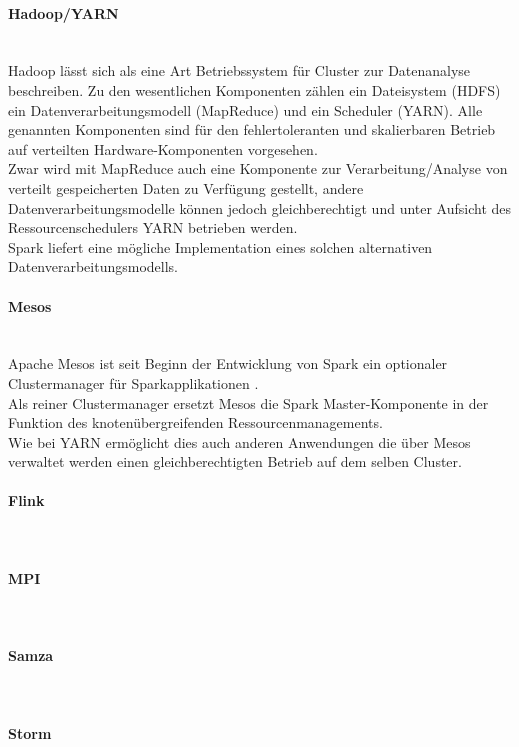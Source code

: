 \paragraph{Hadoop/YARN}\\
Hadoop lässt sich als eine Art Betriebssystem für Cluster zur Datenanalyse beschreiben. Zu den wesentlichen Komponenten zählen ein Dateisystem (HDFS) ein Datenverarbeitungsmodell (MapReduce) und ein Scheduler (YARN).
Alle genannten Komponenten sind für den fehlertoleranten und skalierbaren Betrieb auf verteilten Hardware-Komponenten vorgesehen.\\
Zwar wird mit MapReduce auch eine Komponente zur Verarbeitung/Analyse von verteilt gespeicherten Daten zu Verfügung gestellt, andere Datenverarbeitungsmodelle können jedoch gleichberechtigt und unter Aufsicht des Ressourcenschedulers YARN betrieben werden.\\

Spark liefert eine mögliche Implementation eines solchen alternativen Datenverarbeitungsmodells.

\paragraph{Mesos}\\
Apache Mesos ist seit Beginn der Entwicklung von Spark ein optionaler Clustermanager für Sparkapplikationen \cite{Mat12}.\\
Als reiner Clustermanager ersetzt Mesos die Spark Master-Komponente in der Funktion des knotenübergreifenden Ressourcenmanagements.\\
Wie bei YARN ermöglicht dies auch anderen Anwendungen die über Mesos verwaltet werden einen gleichberechtigten Betrieb auf dem selben Cluster.\\

\paragraph{Flink}\\

\paragraph{MPI}\\

\paragraph{Samza}\\

\paragraph{Storm}\\
